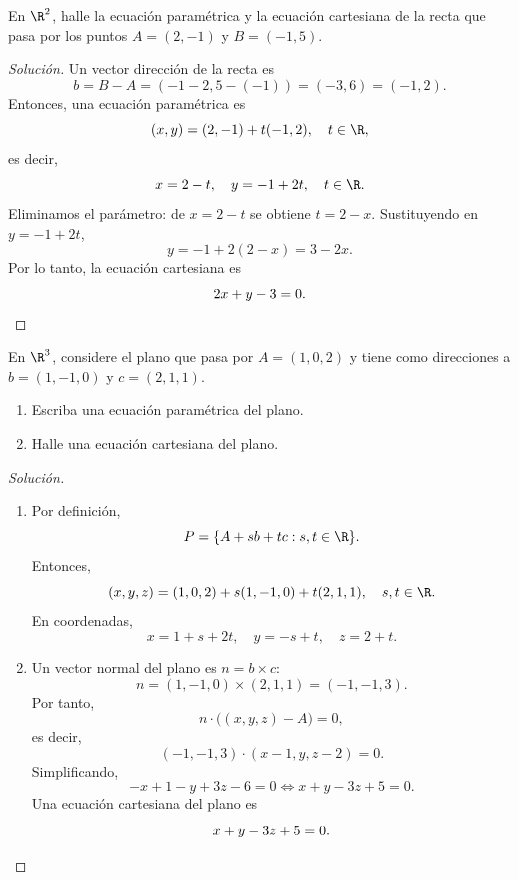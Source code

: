 \documentclass[a4,11pt]{aleph-notas}
\begin{document}
\begin{ejer}
    En $\R^2$, halle la ecuación paramétrica y la ecuación cartesiana de la recta que pasa por los puntos $A=(2,-1)$ y $B=(-1,5)$.
\end{ejer}

\begin{proof}[Solución]\hspace{0pt}
    Un vector dirección de la recta es
    \[
        b=B-A=(-1-2,5-(-1))=(-3,6)=(-1,2).
    \]
    Entonces, una ecuación paramétrica es
    \[
        (x,y)=(2,-1)+t(-1,2),\quad t\in\R,
    \]
    es decir,
    \[
        x=2-t,\quad y=-1+2t,\quad t\in\R.
    \]
    Eliminamos el parámetro: de $x=2-t$ se obtiene $t=2-x$.
    Sustituyendo en $y=-1+2t$,
    \[
        y=-1+2(2-x)=3-2x.
    \]
    Por lo tanto, la ecuación cartesiana es
    \[
        2x+y-3=0.\qedhere
    \]
\end{proof}

\begin{ejer}
    En $\R^3$, considere el plano que pasa por $A=(1,0,2)$ y tiene como direcciones a $b=(1,-1,0)$ y $c=(2,1,1)$.
    \begin{enumerate}
        \item Escriba una ecuación paramétrica del plano.
        \item Halle una ecuación cartesiana del plano.
    \end{enumerate}
\end{ejer}

\begin{proof}[Solución]\hspace{0pt}
    \begin{enumerate}
        \item
        Por definición,
        \[
            P=\{A+s b+t c:s,t\in\R\}.
        \]
        Entonces,
        \[
            (x,y,z)=(1,0,2)+s(1,-1,0)+t(2,1,1),\quad s,t\in\R.
        \]
        En coordenadas,
        \[
            x=1+s+2t,\quad y=-s+t,\quad z=2+t.
        \]
        \item
        Un vector normal del plano es $n=b\times c$:
        \[
            n=(1,-1,0)\times(2,1,1)=(-1,-1,3).
        \]
        Por tanto,
        \[
            n\cdot\big((x,y,z)-A\big)=0,
        \]
        es decir,
        \[
            (-1,-1,3)\cdot(x-1,y,z-2)=0.
        \]
        Simplificando,
        \[
            -x+1-y+3z-6=0
            \iff x+y-3z+5=0.
        \]
        Una ecuación cartesiana del plano es
        \[
            x+y-3z+5=0.\qedhere
        \]
    \end{enumerate}
\end{proof}
\end{document}
